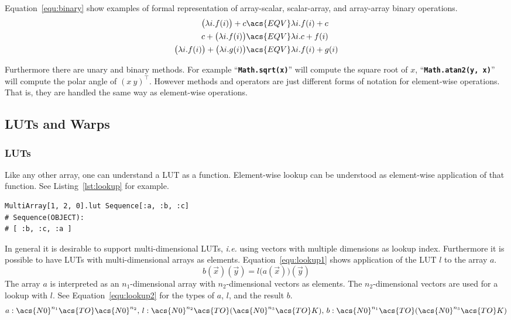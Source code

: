 \documentclass[12pt,a4paper,oneside,openright]{book}
\newcommand{\Eg}{For example }
\newcommand{\ie}{\emph{i.e.} }
\newcommand{\Ie}{That is, }
\newcommand{\equ}[1]{Equation~\ref{equ:#1}}
\newcommand{\lst}[1]{Listing~\ref{lst:#1}}
\newcommand{\code}[1]{``\texttt{\textbf{\textcolor{codegray}{\small{#1}}}}''}
\begin{document}
\begin{CJK}{UTF8}{}
\equ{binary} show examples of formal representation of array-scalar, scalar-array, and array-array binary operations.
\begin{align}\label{equ:binary}
  \begin{split}
    \big(\lambda i.f(i)\big)+c&\acs{EQV}\lambda i.f(i)+c\\
    c+\big(\lambda i.f(i)\big)&\acs{EQV}\lambda i.c+f(i)\\
    \big(\lambda i.f(i)\big)+\big(\lambda i.g(i)\big)&\acs{EQV}\lambda i.f(i)+g(i)
  \end{split}
\end{align}

Furthermore there are unary and binary methods. \Eg \code{Math.sqrt(x)} will compute the square root of $x$, \code{Math.atan2(y, x)} will compute the polar angle of $(x\ y)^\top$. However methods and operators are just different forms of notation for element-wise operations. \Ie they are handled the same way as element-wise operations.

\subsection{\acsp{LUT} and Warps}\label{cha:lutwarps}
\subsubsection{\acsp{LUT}}
Like any other array, one can understand a \ac{LUT} as a function. Element-wise lookup can be understood as element-wise application of that function. See \lst{lookup} for example.
\lstset{language=Ruby,frame=single,numbers=none}
\begin{lstlisting}[float=htbp,caption={Element-wise application of a \acs{LUT}},escapechar=\$,label=lst:lookup]
MultiArray[1, 2, 0].lut Sequence[:a, :b, :c]
# Sequence(OBJECT):
# [ :b, :c, :a ]
\end{lstlisting}

In general it is desirable to support multi-dimensional \acp{LUT}, \ie using vectors with multiple dimensions as lookup index. Furthermore it is possible to have \acp{LUT} with multi-dimensional arrays as elements. \equ{lookup1} shows application of the \ac{LUT} $l$ to the array $a$.
\begin{equation}\label{equ:lookup1}
  b(\vec{x})(\vec{y})=l\big(a(\vec{x})\big)(\vec{y})
\end{equation}
The array $a$ is interpreted as an $n_1$-dimensional array with $n_2$-dimensional vectors as elements. The $n_2$-dimensional vectors are used for a lookup with $l$. See \equ{lookup2} for the types of $a$, $l$, and the result $b$.
\begin{equation}\label{equ:lookup2}
a:\acs{N0}^{n_1}\acs{TO}\acs{N0}^{n_2}\mathrm{,\ }
l:\acs{N0}^{n_2}\acs{TO} (\acs{N0}^{n_3}\acs{TO} K)\mathrm{,\ }
b:\acs{N0}^{n_1}\acs{TO} (\acs{N0}^{n_3}\acs{TO} K)
\end{equation}


\end{CJK}
\end{document}
